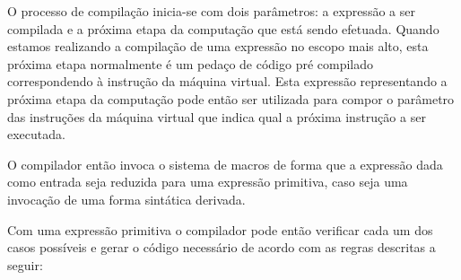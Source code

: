 O processo de compilação inicia-se com dois parâmetros: a expressão a ser
compilada e a próxima etapa da computação que está sendo efetuada. Quando
estamos realizando a compilação de uma expressão no escopo mais alto, esta
próxima etapa normalmente é um pedaço de código pré compilado correspondendo à
instrução  da máquina virtual. Esta expressão representando a próxima etapa
da computação pode então ser utilizada para compor o parâmetro das instruções
da máquina virtual que indica qual a próxima instrução a ser executada.

O compilador então invoca o sistema de macros de forma que a expressão dada como
entrada seja reduzida para uma expressão primitiva, caso seja uma invocação de
uma forma sintática derivada.

Com uma expressão primitiva o compilador pode então verificar cada um dos casos
possíveis e gerar o código necessário de acordo com as regras descritas a
seguir:

